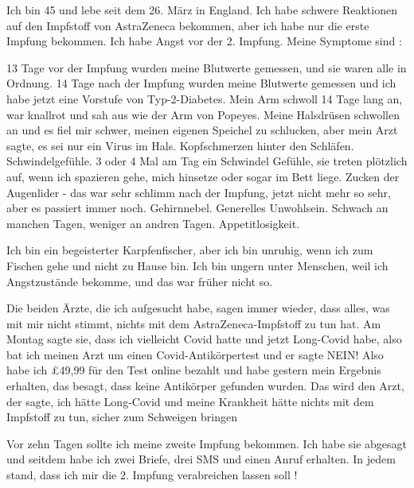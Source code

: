 Ich bin 45 und lebe seit dem 26. März in England. Ich habe schwere Reaktionen
auf den Impfstoff von AstraZeneca bekommen, aber ich habe nur die erste Impfung
bekommen. Ich habe Angst vor der 2. Impfung. Meine Symptome sind :

13 Tage vor der Impfung wurden meine Blutwerte gemessen, und sie waren alle in
Ordnung. 14 Tage nach der Impfung wurden meine Blutwerte gemessen und ich habe
jetzt eine Vorstufe von Typ-2-Diabetes.  Mein Arm schwoll 14 Tage lang an, war
knallrot und sah aus wie der Arm von Popeyes.  Meine Halsdrüsen schwollen an und
es fiel mir schwer, meinen eigenen Speichel zu schlucken, aber mein Arzt sagte,
es sei nur ein Virus im Hals.  Kopfschmerzen hinter den Schläfen.
Schwindelgefühle.  3 oder 4 Mal am Tag ein Schwindel Gefühle, sie treten
plötzlich auf, wenn ich spazieren gehe, mich hinsetze oder sogar im Bett liege.
Zucken der Augenlider - das war sehr schlimm nach der Impfung, jetzt nicht mehr
so sehr, aber es passiert immer noch.  Gehirnnebel.  Generelles Unwohlsein.
Schwach an manchen Tagen, weniger an andren Tagen.  Appetitlosigkeit.

Ich bin ein begeisterter Karpfenfischer, aber ich bin unruhig, wenn ich zum
Fischen gehe und nicht zu Hause bin. Ich bin ungern unter Menschen, weil ich
Angstzustände bekomme, und das war früher nicht so.

Die beiden Ärzte, die ich aufgesucht habe, sagen immer wieder, dass alles, was
mit mir nicht stimmt, nichts mit dem AstraZeneca-Impfstoff zu tun hat. Am Montag
sagte sie, dass ich vielleicht Covid hatte und jetzt Long-Covid habe, also bat
ich meinen Arzt um einen Covid-Antikörpertest und er sagte NEIN! Also habe ich
£49,99 für den Test online bezahlt und habe gestern mein Ergebnis erhalten, das
besagt, dass keine Antikörper gefunden wurden. Das wird den Arzt, der sagte, ich
hätte Long-Covid und meine Krankheit hätte nichts mit dem Impfstoff zu tun,
sicher zum Schweigen bringen

Vor zehn Tagen sollte ich meine zweite Impfung bekommen. Ich habe sie abgesagt
und seitdem habe ich zwei Briefe, drei SMS und einen Anruf erhalten. In jedem
stand, dass ich mir die 2. Impfung verabreichen lassen soll !
